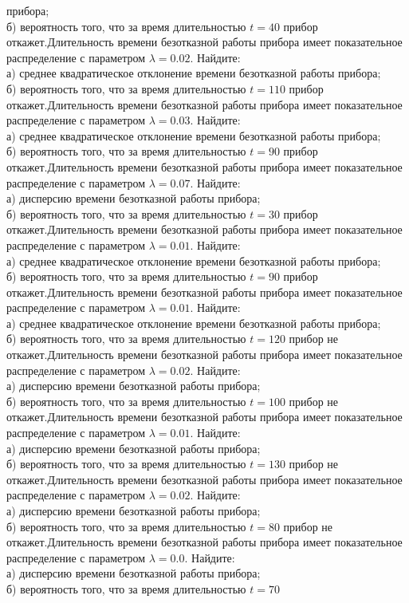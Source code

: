 прибора; \\ \quad б) вероятность того, что за время длительностью $t = 40$ прибор откажет.Длительность времени безотказной работы прибора имеет показательное распределение с параметром $\lambda = 0.02$. Найдите: \\ \quad а) среднее квадратическое отклонение времени безотказной работы прибора; \\ \quad б) вероятность того, что за время длительностью $t = 110$ прибор откажет.Длительность времени безотказной работы прибора имеет показательное распределение с параметром $\lambda = 0.03$. Найдите: \\ \quad а) среднее квадратическое отклонение времени безотказной работы прибора; \\ \quad б) вероятность того, что за время длительностью $t = 90$ прибор откажет.Длительность времени безотказной работы прибора имеет показательное распределение с параметром $\lambda = 0.07$. Найдите: \\ \quad а) дисперсию времени безотказной работы прибора; \\ \quad б) вероятность того, что за время длительностью $t = 30$ прибор откажет.Длительность времени безотказной работы прибора имеет показательное распределение с параметром $\lambda = 0.01$. Найдите: \\ \quad а) среднее квадратическое отклонение времени безотказной работы прибора; \\ \quad б) вероятность того, что за время длительностью $t = 90$ прибор откажет.Длительность времени безотказной работы прибора имеет показательное распределение с параметром $\lambda = 0.01$. Найдите: \\ \quad а) среднее квадратическое отклонение времени безотказной работы прибора; \\ \quad б) вероятность того, что за время длительностью $t = 120$ прибор не откажет.Длительность времени безотказной работы прибора имеет показательное распределение с параметром $\lambda = 0.02$. Найдите: \\ \quad а) дисперсию времени безотказной работы прибора; \\ \quad б) вероятность того, что за время длительностью $t = 100$ прибор не откажет.Длительность времени безотказной работы прибора имеет показательное распределение с параметром $\lambda = 0.01$. Найдите: \\ \quad а) дисперсию времени безотказной работы прибора; \\ \quad б) вероятность того, что за время длительностью $t = 130$ прибор не откажет.Длительность времени безотказной работы прибора имеет показательное распределение с параметром $\lambda = 0.02$. Найдите: \\ \quad а) дисперсию времени безотказной работы прибора; \\ \quad б) вероятность того, что за время длительностью $t = 80$ прибор не откажет.Длительность времени безотказной работы прибора имеет показательное распределение с параметром $\lambda = 0.0$. Найдите: \\ \quad а) дисперсию времени безотказной работы прибора; \\ \quad б) вероятность того, что за время длительностью $t = 70$ 